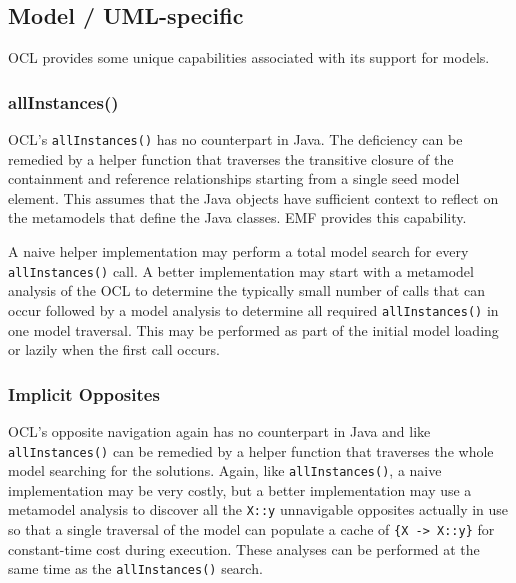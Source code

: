 \documentclass[sigconf]{acmart}
\begin{document}
\subsection{Model / UML-specific}

OCL provides some unique capabilities associated with its support for models.

\subsubsection{allInstances()}

OCL's \texttt{allInstances()} has no counterpart in Java. The deficiency can be remedied by a helper function that traverses the transitive closure of the containment and reference relationships starting from a single seed model element. This assumes that the Java objects have sufficient context to reflect on the metamodels that define the Java classes. EMF provides this capability.



A naive helper implementation may perform a total model search for every \texttt{allInstances()} call. A better implementation may start with a metamodel analysis of the OCL to determine the typically small number of calls that can occur followed by a model analysis to determine all required \texttt{allInstances()} in one model traversal. This may be performed as part of the initial model loading or lazily when the first call occurs.

\subsubsection{Implicit Opposites}\label{Implicit Opposites}

OCL's opposite navigation again has no counterpart in Java and like \texttt{allInstances()} can be remedied by a helper function that traverses the whole model searching for the solutions. Again, like \texttt{allInstances()}, a naive implementation may be very costly, but a better implementation may use a metamodel analysis to discover all the \verb|X::y| unnavigable opposites actually in use so that a single traversal of the model can populate a cache of \verb|{X -> X::y}| for constant-time cost during execution. These analyses can be performed at the same time as the \texttt{allInstances()} search.
\end{document}
